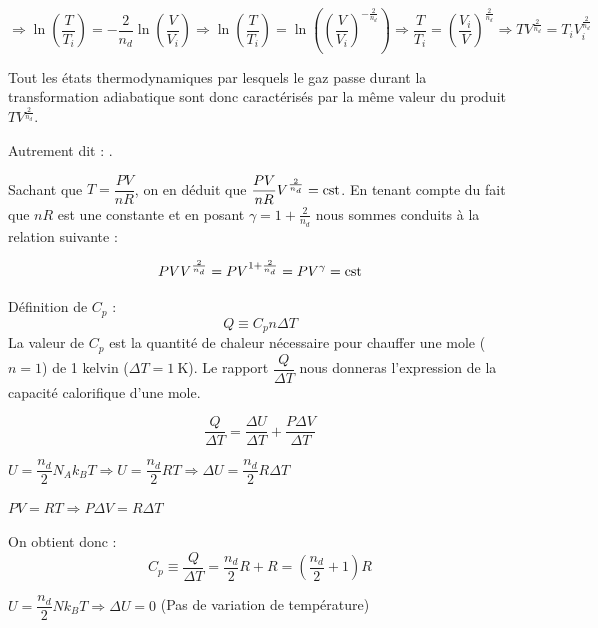 \documentclass	[11pt, a4paper, openany]{book}
\begin{document}
	$\Rightarrow \ln \left(\dfrac{T}{T_i}\right) = -\dfrac{2}{n_d} \ln \left(\dfrac{V}{V_i}\right) \Rightarrow \ln \left(\dfrac{T}{T_i}\right) =  \ln \left(\left(\dfrac{V}{V_i}\right)^{-\frac{2}{n_d}}\right) \Rightarrow \dfrac{T}{T_i} = \left(\dfrac{V_i}{V}\right)^{\frac{2}{n_d}} \Rightarrow TV^{\frac{2}{n_d}} = T_i V_i^{\frac{2}{n_d}}$
	
	Tout les états thermodynamiques par lesquels le gaz passe durant la transformation adiabatique sont donc caractérisés par la même valeur du produit $TV^{\frac{2}{n_d}}$.
	
	Autrement dit : .
	
	Sachant que $T = \dfrac{PV}{nR}$, on en déduit que $\dfrac{PV}{nR}V^{\frac{2}{n_d}} = \cst$. En tenant compte du fait que $nR$ est une constante et en posant $\gamma=1+\frac{2}{n_d}$ nous sommes conduits à la relation suivante :
	
	$$PV V^{\frac{2}{n_d}} = PV^{1+\frac{2}{n_d}}= PV^\gamma=\cst $$

\vspace{0,5cm}

	
	Définition de $C_p$ : $$Q \equiv C_p n \Delta T$$ La valeur de $C_p$ est la quantité de chaleur nécessaire pour chauffer une mole ($n=1$) de 1 kelvin ($\Delta T = 1\ \text{K}$). Le rapport $\dfrac{Q}{\Delta T}$ nous donneras l'expression de la capacité calorifique d'une mole.
	
	$$ \frac{Q}{\Delta T} = \frac{\Delta U}{\Delta T} + \frac{P\Delta V}{\Delta T}$$
	
	$U = \dfrac{n_d}{2}N_Ak_BT \Rightarrow U = \dfrac{n_d}{2}RT \Rightarrow \Delta U = \dfrac{n_d}{2}R\Delta T$
	
	$ PV = RT \Rightarrow P \Delta V = R \Delta T$
	
	On obtient donc : $$ C_p \equiv \frac{Q}{\Delta T} = \frac{n_d}{2}R + R = (\frac{n_d}{2}+1) R$$

\vspace{0,5cm}

	
		$ U = \dfrac{n_d}{2}Nk_BT \Rightarrow \Delta U = 0$ (Pas de variation de température)
		
\end{document}
